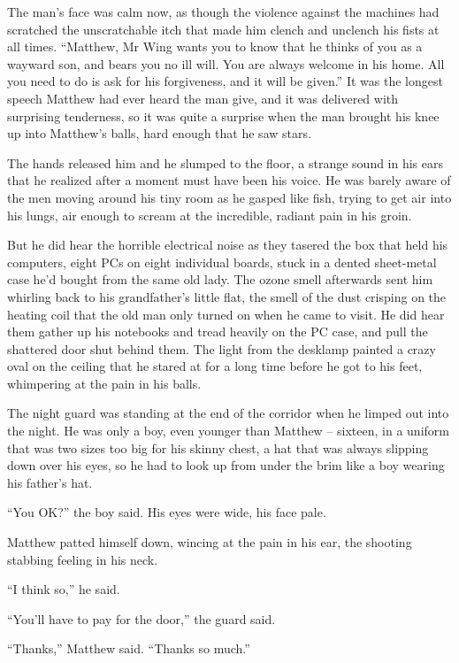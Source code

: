 The man's face was calm now, as though the violence against the
machines had scratched the unscratchable itch that made him clench
and unclench his fists at all times. ``Matthew, Mr Wing wants you to
know that he thinks of you as a wayward son, and bears you no ill
will. You are always welcome in his home. All you need to do is ask
for his forgiveness, and it will be given.'' It was the longest
speech Matthew had ever heard the man give, and it was delivered
with surprising tenderness, so it was quite a surprise when the man
brought his knee up into Matthew's balls, hard enough that he saw
stars.

The hands released him and he slumped to the floor, a strange sound
in his ears that he realized after a moment must have been his
voice. He was barely aware of the men moving around his tiny room
as he gasped like fish, trying to get air into his lungs, air
enough to scream at the incredible, radiant pain in his groin.

But he did hear the horrible electrical noise as they tasered the
box that held his computers, eight PCs on eight individual boards,
stuck in a dented sheet-metal case he'd bought from the same old
lady. The ozone smell afterwards sent him whirling back to his
grandfather's little flat, the smell of the dust crisping on the
heating coil that the old man only turned on when he came to visit.
He did hear them gather up his notebooks and tread heavily on the
PC case, and pull the shattered door shut behind them. The light
from the desklamp painted a crazy oval on the ceiling that he
stared at for a long time before he got to his feet, whimpering at
the pain in his balls.

The night guard was standing at the end of the corridor when he
limped out into the night. He was only a boy, even younger than
Matthew -- sixteen, in a uniform that was two sizes too big for his
skinny chest, a hat that was always slipping down over his eyes, so
he had to look up from under the brim like a boy wearing his
father's hat.

``You OK?'' the boy said. His eyes were wide, his face pale.

Matthew patted himself down, wincing at the pain in his ear, the
shooting stabbing feeling in his neck.

``I think so,'' he said.

``You'll have to pay for the door,'' the guard said.

``Thanks,'' Matthew said. ``Thanks so much.''

